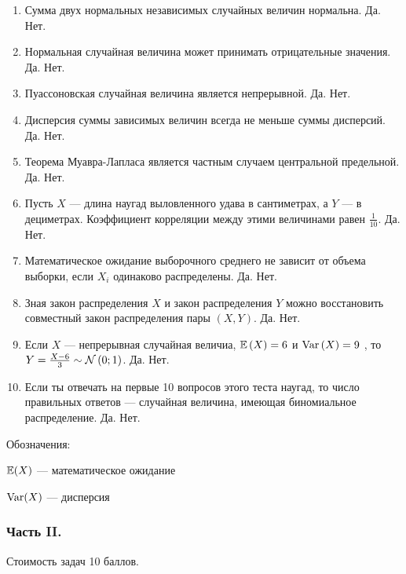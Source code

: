 \begin{enumerate}
\item Сумма двух нормальных независимых случайных величин нормальна.
Да. Нет.
\item Нормальная случайная величина может принимать отрицательные
значения. Да. Нет.
\item Пуассоновская случайная величина является непрерывной. Да. Нет.
\item Дисперсия суммы зависимых величин всегда не меньше суммы
дисперсий. Да. Нет.
\item Теорема Муавра-Лапласа является частным случаем центральной
предельной. Да. Нет.
\item Пусть $X$ — длина наугад выловленного удава в сантиметрах, а
$Y$ — в дециметрах. Коэффициент корреляции между этими
величинами равен $\frac{1}{10}$. Да. Нет.
\item Математическое ожидание выборочного среднего не зависит от
объема выборки, если $X_{i}$ одинаково распределены. Да. Нет.
\item Зная закон распределения $X$ и закон распределения $Y$
можно восстановить совместный закон распределения пары $(X,Y)$. Да. Нет.
\item Если  $X$ — непрерывная случайная величиа,  $\mathbb{E}\left(X\right)=6$  и
$\operatorname{Var}\left(X\right)=9$ , то  $Y=\frac{X-6}{3} \sim
\mathcal{N}\left(0;1\right)$.  Да. Нет.
\item Если ты отвечать на первые 10 вопросов этого теста наугад, то
число правильных ответов — случайная величина, имеющая
биномиальное распределение. Да. Нет.
\end{enumerate}

Обозначения:

$\mathbb{E}(X)$ — математическое ожидание

$\operatorname{Var}(X)$ — дисперсия

\subsubsection*{Часть II.}

Стоимость задач 10 баллов.


